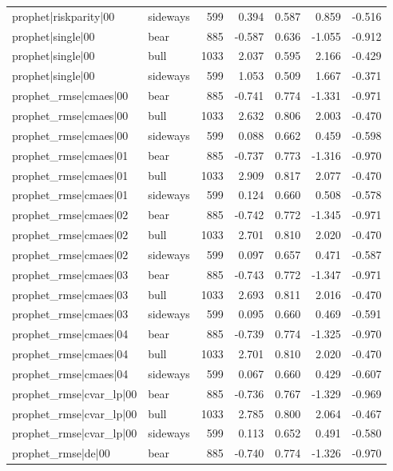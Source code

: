 \begin{table}
\begin{tabular}{llrrrrr}
prophet|riskparity|00 & sideways & 599 & 0.394 & 0.587 & 0.859 & -0.516 \\
prophet|single|00 & bear & 885 & -0.587 & 0.636 & -1.055 & -0.912 \\
prophet|single|00 & bull & 1033 & 2.037 & 0.595 & 2.166 & -0.429 \\
prophet|single|00 & sideways & 599 & 1.053 & 0.509 & 1.667 & -0.371 \\
prophet\_rmse|cmaes|00 & bear & 885 & -0.741 & 0.774 & -1.331 & -0.971 \\
prophet\_rmse|cmaes|00 & bull & 1033 & 2.632 & 0.806 & 2.003 & -0.470 \\
prophet\_rmse|cmaes|00 & sideways & 599 & 0.088 & 0.662 & 0.459 & -0.598 \\
prophet\_rmse|cmaes|01 & bear & 885 & -0.737 & 0.773 & -1.316 & -0.970 \\
prophet\_rmse|cmaes|01 & bull & 1033 & 2.909 & 0.817 & 2.077 & -0.470 \\
prophet\_rmse|cmaes|01 & sideways & 599 & 0.124 & 0.660 & 0.508 & -0.578 \\
prophet\_rmse|cmaes|02 & bear & 885 & -0.742 & 0.772 & -1.345 & -0.971 \\
prophet\_rmse|cmaes|02 & bull & 1033 & 2.701 & 0.810 & 2.020 & -0.470 \\
prophet\_rmse|cmaes|02 & sideways & 599 & 0.097 & 0.657 & 0.471 & -0.587 \\
prophet\_rmse|cmaes|03 & bear & 885 & -0.743 & 0.772 & -1.347 & -0.971 \\
prophet\_rmse|cmaes|03 & bull & 1033 & 2.693 & 0.811 & 2.016 & -0.470 \\
prophet\_rmse|cmaes|03 & sideways & 599 & 0.095 & 0.660 & 0.469 & -0.591 \\
prophet\_rmse|cmaes|04 & bear & 885 & -0.739 & 0.774 & -1.325 & -0.970 \\
prophet\_rmse|cmaes|04 & bull & 1033 & 2.701 & 0.810 & 2.020 & -0.470 \\
prophet\_rmse|cmaes|04 & sideways & 599 & 0.067 & 0.660 & 0.429 & -0.607 \\
prophet\_rmse|cvar\_lp|00 & bear & 885 & -0.736 & 0.767 & -1.329 & -0.969 \\
prophet\_rmse|cvar\_lp|00 & bull & 1033 & 2.785 & 0.800 & 2.064 & -0.467 \\
prophet\_rmse|cvar\_lp|00 & sideways & 599 & 0.113 & 0.652 & 0.491 & -0.580 \\
prophet\_rmse|de|00 & bear & 885 & -0.740 & 0.774 & -1.326 & -0.970 \\

\end{tabular}
\end{table}
